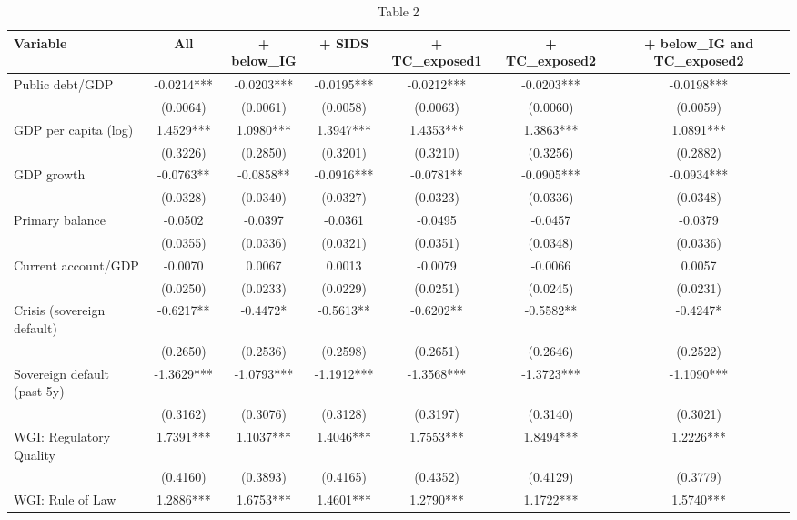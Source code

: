 \documentclass[10pt]{article}
\begin{document}
\thispagestyle{empty}
\begin{table}[h!]
  \centering
  \scriptsize
  \caption{Table 2}
  \label{rating-table-iso-dummies}
  \begin{threeparttable}
  \begin{tabular}{lcccccc}
    \toprule
    Variable & All & + below\_IG & + SIDS & + TC\_exposed1 & + TC\_exposed2 & + below\_IG and TC\_exposed2 \\
    \midrule
    Public debt/GDP & -0.0214*** & -0.0203*** & -0.0195*** & -0.0212*** & -0.0203*** & -0.0198*** \\
     & (0.0064) & (0.0061) & (0.0058) & (0.0063) & (0.0060) & (0.0059) \\[2pt]
    GDP per capita (log) & 1.4529*** & 1.0980*** & 1.3947*** & 1.4353*** & 1.3863*** & 1.0891*** \\
     & (0.3226) & (0.2850) & (0.3201) & (0.3210) & (0.3256) & (0.2882) \\[2pt]
    GDP growth & -0.0763** & -0.0858** & -0.0916*** & -0.0781** & -0.0905*** & -0.0934*** \\
     & (0.0328) & (0.0340) & (0.0327) & (0.0323) & (0.0336) & (0.0348) \\[2pt]
    Primary balance & -0.0502 & -0.0397 & -0.0361 & -0.0495 & -0.0457 & -0.0379 \\
     & (0.0355) & (0.0336) & (0.0321) & (0.0351) & (0.0348) & (0.0336) \\[2pt]
    Current account/GDP & -0.0070 & 0.0067 & 0.0013 & -0.0079 & -0.0066 & 0.0057 \\
     & (0.0250) & (0.0233) & (0.0229) & (0.0251) & (0.0245) & (0.0231) \\[2pt]
    Crisis (sovereign default) & -0.6217** & -0.4472* & -0.5613** & -0.6202** & -0.5582** & -0.4247* \\
     & (0.2650) & (0.2536) & (0.2598) & (0.2651) & (0.2646) & (0.2522) \\[2pt]
    Sovereign default (past 5y) & -1.3629*** & -1.0793*** & -1.1912*** & -1.3568*** & -1.3723*** & -1.1090*** \\
     & (0.3162) & (0.3076) & (0.3128) & (0.3197) & (0.3140) & (0.3021) \\[2pt]
    WGI: Regulatory Quality & 1.7391*** & 1.1037*** & 1.4046*** & 1.7553*** & 1.8494*** & 1.2226*** \\
     & (0.4160) & (0.3893) & (0.4165) & (0.4352) & (0.4129) & (0.3779) \\[2pt]
    WGI: Rule of Law & 1.2886*** & 1.6753*** & 1.4601*** & 1.2790*** & 1.1722*** & 1.5740*** \\

\end{tabular}
\end{threeparttable}
\end{table}
\end{document}
